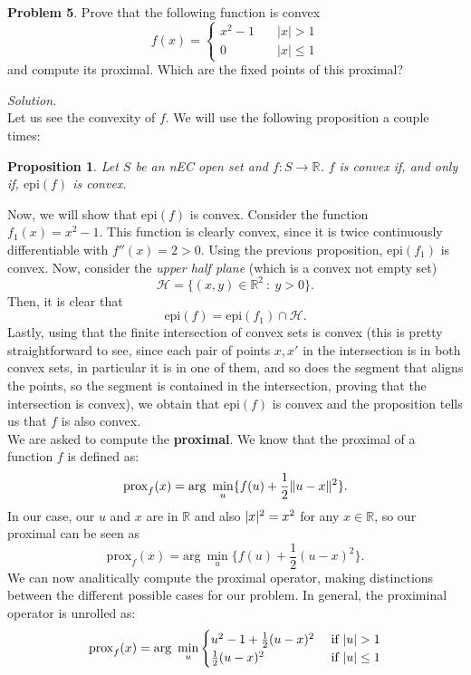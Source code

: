 \documentclass[a4paper]{article}
\DeclarePairedDelimiter\abs{\lvert}{\rvert}%
\DeclarePairedDelimiter\norm{\lVert}{\rVert}%
\newtheorem{nprop}{Proposition}
\newenvironment{problem}[2][Problem]
    { \begin{mdframed}[backgroundcolor=gray!20] \vspace*{0.1cm} \textbf{#1 #2}.}
    {  \end{mdframed}\vspace{0.3cm}}
\newenvironment{solution}
    {\textit{Solution.}\\}
    {}
\newcommand{\R}{\mathbb R}
\begin{document}
\begin{problem}{5}
Prove that the following function is convex
\[
  f(x) =
  \begin{cases}
    x^{2}-1 \quad & |x|>1      \\
    0  \quad      & |x| \leq 1
  \end{cases}
\]
and compute its proximal. Which are the fixed points of this proximal?
\end{problem}
\begin{solution}
  Let us see the convexity of \(f\). We will use the following proposition a couple times:
  \begin{nprop}
    Let \(S\) be an nEC open set and \(f:S\to \R\). \(f\) is convex if, and only if, \(\text{epi}(f)\) is convex.
  \end{nprop}

  Now, we will show that \(\text{epi}(f)\) is convex. Consider the function \(f_1(x) = x^2 - 1\). This function is clearly convex, since it is twice continuously differentiable with \(f''(x) = 2 > 0\). Using the previous proposition, \(\text{epi}(f_1)\) is convex. Now, consider the \emph{upper half plane} (which is a convex not empty set)
  \[
    \mathcal H = \{ (x,y) \in \R^2 \ : \ y > 0\}.
  \]
  Then, it is clear that
  \[
    \text{epi}(f) = \text{epi}(f_1) \cap \mathcal H.
  \]
  Lastly, using that the finite intersection of convex sets is convex (this is pretty straightforward to see, since each pair of points \(x,x'\) in the intersection is in both convex sets, in particular it is in one of them, and so does the segment that aligns the points, so the segment is contained in the intersection, proving that the intersection is convex), we obtain that \(\text{epi}(f)\) is convex and the proposition tells us that \(f\) is also convex.\\

  We are asked to compute the \textbf{proximal}. We know that the proximal of a function \(f\) is defined as:
  \[
    \text{prox}_f(x) = \text{arg}\ \min_u \{f(u) + \frac{1}{2} \norm{u-x}^2\}.
  \]
  In our case, our \(u\) and \(x\) are in \(\R\) and also \(\abs{x}^2 = x^2\) for any \(x\in \R\), so our proximal can be seen as
  \[
    \text{prox}_f(x) = \text{arg}\ \min_u \{f(u) + \frac{1}{2}(u-x)^2\}.
  \]
  We can now analitically compute the proximal operator, making distinctions between the different possible cases for our problem. In general, the proximinal operator is unrolled as:
  \begin{equation}\label{ej5:prox}
    \text{prox}_f(x) = \text{arg}\ \min_u \begin{cases}
      u^2 - 1 + \frac{1}{2}(u-x)^2 & \text{ if } \abs{u} > 1    \\
      \frac{1}{2}(u-x)^2           & \text{ if } \abs{u} \leq 1
    \end{cases}
  \end{equation}


\end{solution}
\end{document}
